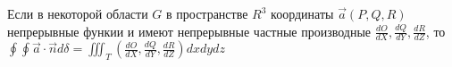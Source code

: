 \begin{theorem}
    Если в некоторой области $G$ в пространстве $R^3$ координаты $\vec{a} (P, Q, R)$ непрерывные функии и имеют непрерывные частные производные $\frac{dO}{dX}, \frac{dQ}{dY}, \frac{dR}{dZ}$, то $\oint \oint \vec{a}\cdot\vec{n} d\delta = \iiint_T (\frac{dO}{dX}, \frac{dQ}{dY}, \frac{dR}{dZ})dxdydz $
\end{theorem}
